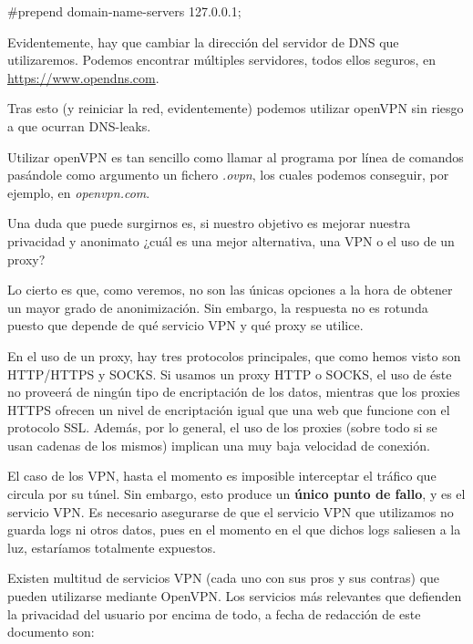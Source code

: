	{\selectfont 
		\#prepend domain-name-servers 127.0.0.1;
	}

	Evidentemente, hay que cambiar la dirección del servidor de DNS que utilizaremos. Podemos encontrar múltiples servidores, todos ellos seguros, en \url{https://www.opendns.com}.
	
	Tras esto (y reiniciar la red, evidentemente) podemos utilizar openVPN sin riesgo a que ocurran DNS-leaks.
	
	Utilizar openVPN es tan sencillo como llamar al programa por línea de comandos pasándole como argumento un fichero \textit{.ovpn}, los cuales podemos conseguir, por ejemplo, en \textit{openvpn.com}.
	
	Una duda que puede surgirnos es, si nuestro objetivo es mejorar nuestra privacidad y anonimato ¿cuál es una mejor alternativa, una VPN o el uso de un proxy? 
	
	Lo cierto es que, como veremos, no son las únicas opciones a la hora de obtener un mayor grado de anonimización. Sin embargo, la respuesta no es rotunda puesto que depende de qué servicio VPN y qué proxy se utilice.
	
	En el uso de un proxy, hay tres protocolos principales, que como hemos visto son HTTP/HTTPS y SOCKS.
	Si usamos un proxy HTTP o SOCKS, el uso de éste no proveerá de ningún tipo de encriptación de los datos, mientras que los proxies HTTPS ofrecen un nivel de encriptación igual que una web que funcione con el protocolo SSL. Además, por lo general, el uso de los proxies (sobre todo si se usan cadenas de los mismos) implican una muy baja velocidad de conexión.
	
	El caso de los VPN, hasta el momento es imposible interceptar el tráfico que circula por su túnel. Sin embargo, esto produce un \textbf{único punto de fallo}, y es el servicio VPN. Es necesario asegurarse de que el servicio VPN que utilizamos no guarda logs ni otros datos, pues en el momento en el que dichos logs saliesen a la luz, estaríamos totalmente expuestos.
	
	Existen multitud de servicios VPN (cada uno con sus pros y sus contras) que pueden utilizarse mediante OpenVPN. Los servicios más relevantes que defienden la privacidad del usuario por encima de todo, a fecha de redacción de este documento son:
	
